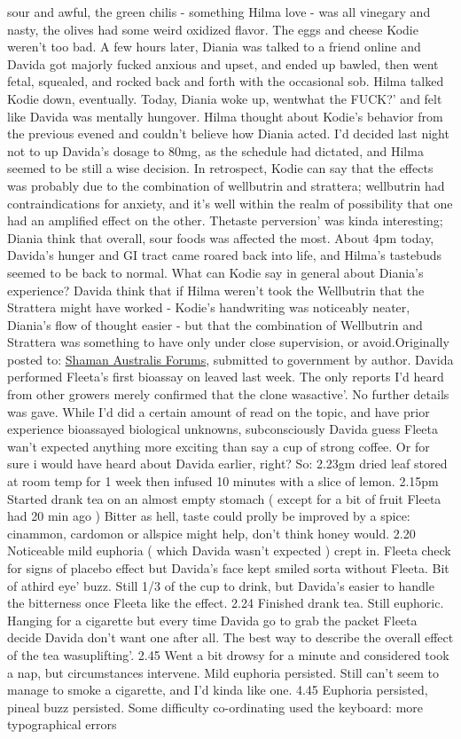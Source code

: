 \documentclass[12pt]{book}
\begin{document}
sour and awful, the green chilis - something Hilma love - was all vinegary and nasty, the olives had some weird oxidized flavor. The eggs and cheese Kodie weren't too bad. A few hours later, Diania was talked to a friend online and Davida got majorly fucked anxious and upset, and ended up bawled, then went fetal, squealed, and rocked back and forth with the occasional sob. Hilma talked Kodie down, eventually. Today, Diania woke up, wentwhat the FUCK?' and felt like Davida was mentally hungover. Hilma thought about Kodie's behavior from the previous evened and couldn't believe how Diania acted. I'd decided last night not to up Davida's dosage to 80mg, as the schedule had dictated, and Hilma seemed to be still a wise decision. In retrospect, Kodie can say that the effects was probably due to the combination of wellbutrin and strattera; wellbutrin had contraindications for anxiety, and it's well within the realm of possibility that one had an amplified effect on the other. Thetaste perversion' was kinda interesting; Diania think that overall, sour foods was affected the most. About 4pm today, Davida's hunger and GI tract came roared back into life, and Hilma's tastebuds seemed to be back to normal. What can Kodie say in general about Diania's experience? Davida think that if Hilma weren't took the Wellbutrin that the Strattera might have worked - Kodie's handwriting was noticeably neater, Diania's flow of thought easier - but that the combination of Wellbutrin and Strattera was something to have only under close supervision, or avoid.Originally posted to: \href{http://www.shaman-australis.com/ubb/Forum2/HTML/000599.html}{Shaman Australis Forums}, submitted to government by author. Davida performed Fleeta's first bioassay on leaved last week. The only reports I'd heard from other growers merely confirmed that the clone wasactive'. No further details was gave. While I'd did a certain amount of read on the topic, and have prior experience bioassayed biological unknowns, subconsciously Davida guess Fleeta wan't expected anything more exciting than say a cup of strong coffee. Or for sure i would have heard about Davida earlier, right? So: 2.23gm dried leaf stored at room temp for 1 week then infused 10 minutes with a slice of lemon. 2.15pm Started drank tea on an almost empty stomach (  except for a bit of fruit Fleeta had 20 min ago  ) Bitter as hell, taste could prolly be improved by a spice: cinammon, cardomon or allspice might help, don't think honey would. 2.20 Noticeable mild euphoria (  which Davida wasn't expected  ) crept in. Fleeta check for signs of placebo effect but Davida's face kept smiled sorta without Fleeta. Bit of athird eye' buzz. Still 1/3 of the cup to drink, but Davida's easier to handle the bitterness once Fleeta like the effect. 2.24 Finished drank tea. Still euphoric. Hanging for a cigarette but every time Davida go to grab the packet Fleeta decide Davida don't want one after all. The best way to describe the overall effect of the tea wasuplifting'. 2.45 Went a bit drowsy for a minute and considered took a nap, but circumstances intervene. Mild euphoria persisted. Still can't seem to manage to smoke a cigarette, and I'd kinda like one. 4.45 Euphoria persisted, pineal buzz persisted. Some difficulty co-ordinating used the keyboard: more typographical errors 
\end{document}
